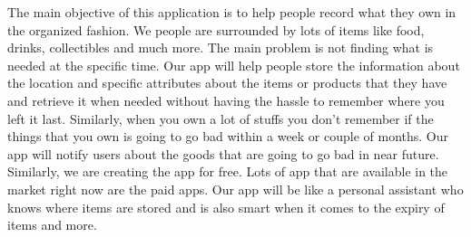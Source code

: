 The main objective of this application is to help people record what they own in the organized fashion. We people are surrounded by lots of items like food, drinks, collectibles and much more. The main problem is not finding what is needed at the specific time. Our app will help people store the information about the location and specific attributes about the items or products that they have and retrieve it when needed without having the hassle to remember where you left it last. Similarly, when you own a lot of stuffs you don't remember if the things that you own is going to go bad within a week or couple of months. Our app will notify users about the goods that are going to go bad in near future. Similarly, we are creating the app for free. Lots of app that are available in the market right now are the paid apps. Our app will be like a personal assistant who knows where items are stored and is also smart when it comes to the expiry of items and more.